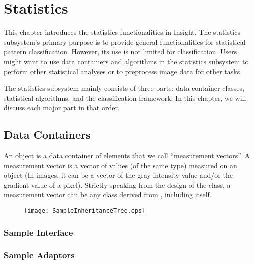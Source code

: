 \chapter{Statistics}
\label{sec:StaisticsFramework}

This chapter introduces the statistics functionalities in Insight. The
statistics subsystem's primary purpose is to provide general functionalities
for statistical pattern classification. However, its use is not limited
for classification. Users might want to use data containers and
algorithms in the statistics subsystem to perform other statistical
analyses or to preprocess image data for other tasks.

The statistics subsystem mainly consists of three parts: data container
classes, statistical algorithms, and the classification framework. In this
chapter, we will discuss each major part in that order.

\section{Data Containers}
\label{sec:StatisticsDataContainer}

An  object is a data container of
elements that we call ``measurement vectors''. A measurement vector is a
vector of values (of the same type) measured on an object (In images, it
can be a vector of the gray intensity value and/or the gradient value of
a pixel). Strictly speaking from the design of the
 class, a measurement vector can be any
class derived from , including 
itself.

\begin{figure}
  \centering
  \texttt{[image: SampleInheritanceTree.eps]}
  \protect\label{fig:SampleInheritanceTree}
\end{figure}

\subsection{Sample Interface}
\label{sec:SampleInterface}



\subsection{Sample Adaptors}
\label{sec:SampleAdaptors}


